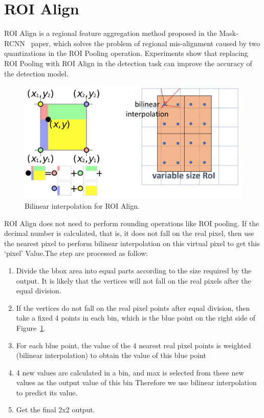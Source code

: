 \label{sec:roialign}
\section{ROI Align}
ROI Align is a regional feature aggregation method proposed in the Mask-RCNN~\cite{he2018mask} paper, which solves the problem of regional mis-alignment caused by two quantizations in the ROI Pooling operation. Experiments show that replacing ROI Pooling with ROI Align in the detection task can improve the accuracy of the detection model.

\begin{figure}[!htbp]
	\centering
	\includegraphics[width=1\linewidth]{figures/roi_align}
	\caption[Bilinear interpolation for ROI Align]{Bilinear interpolation for ROI Align.}
	\label{fig:roialign}
\end{figure}

ROI Align does not need to perform rounding operations like ROI pooling. If the decimal number is calculated, that is, it does not fall on the real pixel, then use the nearest pixel to perform bilinear interpolation on this virtual pixel to get this `pixel'  Value.The step are processed as follow:

\begin{enumerate}[1.]
	\item Divide the bbox area into equal parts according to the size required by the output. It is likely that the vertices will not fall on the real pixels after the equal division.
	\item If the vertices do not fall on the real pixel points after equal division, then take a fixed 4 points in each bin, which is the blue point on the right side of Figure~\ref{fig:roialign}.
	\item For each blue point, the value of the 4 nearest real pixel points is weighted (bilinear interpolation) to obtain the value of this blue point
	\item  4 new values are calculated in a bin, and max is selected from these new values as the output value of this bin Therefore we use bilinear interpolation to predict its value.
	\item Get the final 2x2 output.
\end{enumerate}



